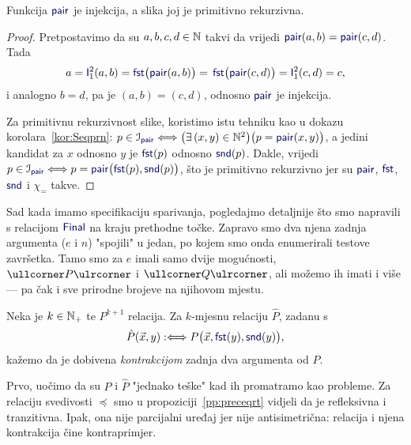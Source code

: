 \begin{propozicija}[{name=[injektivnost i primitivna rekurzivnost slike sparivanja]}]
Funkcija $\f{pair}$ je injekcija, a slika joj je primitivno rekurzivna.
\end{propozicija}
\begin{proof}
Pretpostavimo da su $a,b,c,d\in{\mathbb N}$ takvi da vrijedi $\f{pair}(a,b)=\f{pair}(c,d)$. Tada
\begin{equation}
    a=\f I_1^2(a,b)=\f{fst}\bigl(\f{pair}(a,b)\bigr)=\,
    \f{fst}\bigl(\f{pair}(c,d)\bigr)=\f I_1^2(c,d)=c\text,
\end{equation}
i analogno $b=d$, pa je $(a,b)=(c,d)$, odnosno $\f{pair}$ je injekcija.

Za primitivnu rekurzivnost slike, koristimo istu tehniku kao u dokazu korolara~\ref{kor:Seqprn}: $p\in\im{\f{pair}}\Longleftrightarrow\bigl(\exists\,(x,y)\in\N^2\bigr)\bigl(p=\f{pair}(x,y)\bigr)$, a jedini kandidat za $x$ odnosno $y$ je $\f{fst}(p)$ odnosno $\f{snd}(p)$. Dakle, vrijedi
    $p\in\im{\f{pair}}\Longleftrightarrow p=\f{pair}\bigl(\f{fst}(p),\f{snd}(p)\bigr)$,
što je primitivno rekurzivno jer su $\f{pair}$, $\f{fst}$, $\f{snd}$ i $\chi_=$ takve.
\end{proof}

Sad kada imamo specifikaciju sparivanja, pogledajmo detaljnije što smo napravili s relacijom $\f{Final}$ na kraju prethodne točke. Zapravo smo dva njena zadnja argumenta ($e$ i $n$) "spojili" u jedan, po kojem smo onda enumerirali testove završetka. Tamo smo za $e$ imali samo dvije mogućnosti, $\kprog P$ i $\kprog Q$, ali možemo ih imati i više --- pa čak i sve prirodne brojeve na njihovom mjestu.

\begin{definicija}[{name=[kontrakcija brojevne relacije]}]
Neka je $k\in{\mathbb N}_+$ te $P^{k+1}$ relacija. Za $k$-mjesnu relaciju $\hat P$, zadanu s
\begin{equation}
    \hat P(\vec x,y):\Longleftrightarrow P\bigl(\vec x,\f{fst}(y),\f{snd}(y)\bigr)\text,
\end{equation}
kažemo da je dobivena \emph{kontrakcijom} zadnja dva argumenta od $P$.
\end{definicija}

Prvo, uočimo da su $P$ i $\hat P$ "jednako teške" kad ih promatramo kao probleme. Za relaciju svedivosti $\preceq$ smo u propoziciji~\ref{pp:preceqrt} vidjeli da je refleksivna i tranzitivna. Ipak, ona nije parcijalni uređaj jer nije antisimetrična: relacija i njena kontrakcija čine kontraprimjer.

